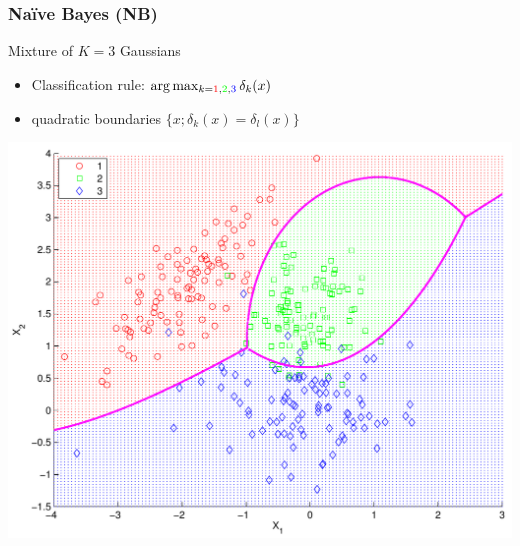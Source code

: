 \documentclass[compress, smaller, serif, 9pt]{beamer}
\begin{document}
\begin{frame}
 \frametitle{Naïve Bayes (NB)}
\begin{block}{Mixture of $K=3$ Gaussians}
\begin{itemize}
   \item  Classification rule: $\arg \max_{k=\textcolor{red}{1},\textcolor{green}{2},\textcolor{blue}{3}}
\delta_k(x)$
\item quadratic boundaries $\{ x ; \delta_k(x)=\delta_l(x) \} $
\end{itemize}
\end{block}
\vspace*{-5mm}

\begin{center}
  \includegraphics[width=.65\textwidth]{nb_analysis_bounds.pdf} \\
\end{center}

\end{frame}
\end{document}
